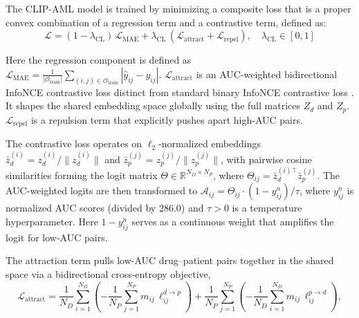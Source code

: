 \documentclass[sigconf,authordraft]{acmart}
\begin{document}
The CLIP-AML model is trained by minimizing a composite loss that is a proper convex combination of a regression term and a contrastive term, defined as:
\vspace{-2mm}
\begin{equation*}
\mathcal{L} = (1 - \lambda_{\text{CL}})\,\mathcal{L}_{\text{MAE}} + \lambda_{\text{CL}}\,(\mathcal{L}_{\text{attract}} + \mathcal{L}_{\text{repel}}), \quad \lambda_{\text{CL}} \in [0,1]
\end{equation*}

Here the regression component is defined as \\
$\mathcal{L}_{\text{MAE}} = \frac{1}{|\mathcal{O}_{\text{train}}|}\sum_{(i,j)\in\mathcal{O}_{\text{train}}}|\hat{y}_{ij} - y_{ij}|$. $\mathcal{L}_{\text{attract}}$ is an AUC-weighted bidirectional InfoNCE \cite{rusak2024infonce} contrastive loss distinct from standard binary InfoNCE contrastive loss \cite{rusak2024infonce}. It shapes the shared embedding space globally using the full matrices $Z_{d}$ and $Z_{p}$.  $\mathcal{L}_{\text{repel}}$ is a repulsion term that explicitly pushes apart high-AUC pairs. %

The contrastive loss operates on $\ell_2$-normalized embeddings $\bar{z}_d^{(i)} = z_d^{(i)} / \|z_d^{(i)}\|$
and $\bar{z}_p^{(j)} = z_p^{(j)} / \|z_p^{(j)}\|$, with pairwise cosine similarities forming the logit matrix $\Theta \in \mathbb{R}^{N_D \times N_P}$, where $\Theta_{ij} = \bar{z}_d^{(i)\top}\bar{z}_p^{(j)}$. The AUC-weighted logits are then transformed to $\mathcal{A}_{ij} = \Theta_{ij} \cdot (1-y^{n}_{ij}) / \tau$, where $y^{n}_{ij}$ is normalized AUC scores (divided by $286.0$) and $\tau > 0$ is a temperature hyperparameter. Here $1-y^{n}_{ij}$ serves as a continuous weight that amplifies the logit for low-AUC pairs. 

The attraction term pulls low-AUC drug–patient pairs together in the shared space via a bidirectional cross-entropy objective,
\begin{equation*}
    \mathcal{L}_{\text{attract}} = \frac{1}{N_D}\sum_{i=1}^{N_D}\left(-\frac{1}{N_P}\sum_{j=1}^{N_P} m_{ij}\,\ell_{ij}^{d\to p}\right) + \frac{1}{N_P}\sum_{j=1}^{N_P}\left(-\frac{1}{N_D}\sum_{i=1}^{N_D} m_{ij}\,\ell_{ij}^{p\to d}\right),
\end{equation*}
\end{document}
